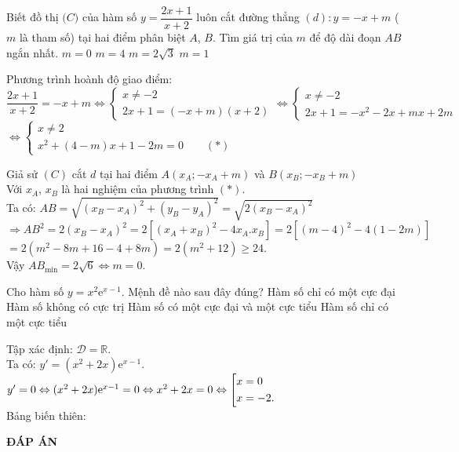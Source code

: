 \begin{ex}%
 Biết đồ thị $\mathscr(C)$ của hàm số $y = \dfrac{2x+1}{x+2}$ luôn cắt đường thẳng $(d): y = -x+m$ ($m$ là tham số) tại hai điểm phân biệt $A$, $B$. Tìm giá trị của $m$ để độ dài đoạn $AB$ ngắn nhất.
 \choice
  {\True $m = 0$}
  {$m = 4$}
  {$m = 2\sqrt{3}$}
  {$m = 1$}
 \loigiai
  {
  Phương trình hoành độ giao điểm:\\ $\dfrac{2x+1}{x+2}=-x+m\Leftrightarrow\begin{cases}
  x\ne-2\\2x+1=(-x+m)(x+2)
  \end{cases}
  \Leftrightarrow
  \begin{cases}
  x\ne-2\\
  2x+1=-x^2-2x+mx+2m
  \end{cases}$\\
  $\Leftrightarrow\begin{cases}
  x\ne2\\
  x^2+(4-m)x+1-2m=0\qquad(*)
  \end{cases}$
  
  Giả sử $(C)$ cắt $d$ tại hai điểm $A(x_A;-x_A+m)$ và $B(x_B;-x_B+m)$\\
  Với $x_A$, $x_B$ là hai nghiệm của phương trình $(*)$.\\
  Ta có: $AB=\sqrt{(x_B-x_A)^2+(y_B-y_A)^2}=\sqrt{2(x_B-x_A)^2}$\\
  $\Rightarrow AB^2=2(x_B-x_A)^2=2\left[(x_A+x_B)^2-4x_A.x_B\right]=2\left[(m-4)^2-4(1-2m)\right]$\\
  $=2(m^2-8m+16-4+8m)=2(m^2+12)\geq24$.\\
  Vậy $AB_{\min}=2\sqrt{6}\Leftrightarrow m=0$. }
\end{ex}


\begin{ex}%
 Cho hàm số $y = x^2 \mathrm{e}^{x-1}$. Mệnh đề nào sau đây đúng?
 \choice
  {Hàm số chỉ có một cực đại}
  {Hàm số không có cực trị}
  {\True Hàm số có một cực đại và một cực tiểu}
  {Hàm số chỉ có một cực tiểu}
 \loigiai
  {
  Tập xác định: $\mathscr{D} = \mathbb{R}$.\\
  Ta có: $y' = (x^2 + 2x)\mathrm{e}^{x-1}$.\\
  $y' = 0 \Leftrightarrow (x^2 + 2x)\mathrm{e}^{x-1} = 0 \Leftrightarrow x^2 + 2x = 0 \Leftrightarrow \left[\begin{aligned}& x = 0 \\& x = -2.\end{aligned}\right.$\\
  Bảng biến thiên:
  \begin{center}
  \end{center}
  }
\end{ex}




\newpage
\begin{center}
	\textbf{ĐÁP ÁN}
\end{center}
\begin{multicols}{10}
	 
\end{multicols}